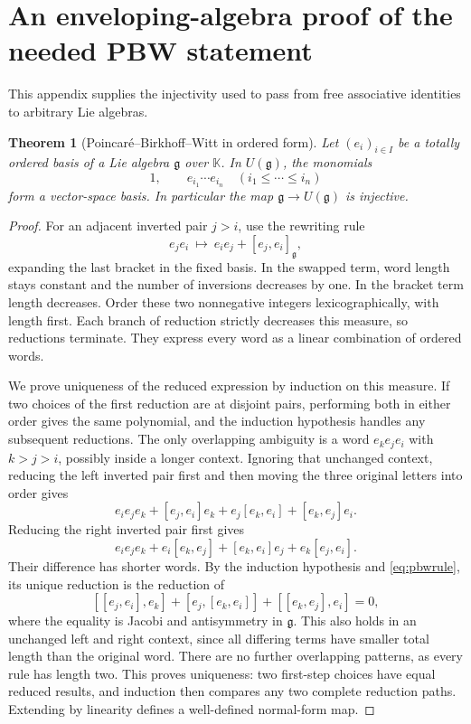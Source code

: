 \documentclass[11pt]{article}
\newtheorem{theorem}{Theorem}[section]
\theoremstyle{definition}
\theoremstyle{remark}
\newcommand{\K}{\mathbb K}
\newcommand{\g}{\mathfrak g}
\numberwithin{equation}{section}
\begin{document}
\appendix
\section{An enveloping-algebra proof of the needed PBW statement}\label{app:pbw}
This appendix supplies the injectivity used to pass from free associative identities to arbitrary Lie algebras.
\begin{theorem}[Poincar\'e--Birkhoff--Witt in ordered form]\label{thm:pbw}
Let $(e_i)_{i\in I}$ be a totally ordered basis of a Lie algebra $\g$ over $\K$. In $U(\g)$, the monomials
\[
 1,\qquad e_{i_1}\cdots e_{i_n}\quad(i_1\leq\cdots\leq i_n)
\]
form a vector-space basis. In particular the map $\g\to U(\g)$ is injective.
\end{theorem}
\begin{proof}
For an adjacent inverted pair $j>i$, use the rewriting rule
\begin{equation}\label{eq:pbwrule}
 e_je_i\ \longmapsto\ e_ie_j+[e_j,e_i]_{\g},
\end{equation}
expanding the last bracket in the fixed basis. In the swapped term, word length stays constant and the number of inversions decreases by one. In the bracket term length decreases. Order these two nonnegative integers lexicographically, with length first. Each branch of reduction strictly decreases this measure, so reductions terminate. They express every word as a linear combination of ordered words.

We prove uniqueness of the reduced expression by induction on this measure. If two choices of the first reduction are at disjoint pairs, performing both in either order gives the same polynomial, and the induction hypothesis handles any subsequent reductions. The only overlapping ambiguity is a word $e_ke_je_i$ with $k>j>i$, possibly inside a longer context. Ignoring that unchanged context, reducing the left inverted pair first and then moving the three original letters into order gives
\[
 e_ie_je_k+[e_j,e_i]e_k+e_j[e_k,e_i]+[e_k,e_j]e_i.
\]
Reducing the right inverted pair first gives
\[
 e_ie_je_k+e_i[e_k,e_j]+[e_k,e_i]e_j+e_k[e_j,e_i].
\]
Their difference has shorter words. By the induction hypothesis and \eqref{eq:pbwrule}, its unique reduction is the reduction of
\[
 [[e_j,e_i],e_k]+[e_j,[e_k,e_i]]+[[e_k,e_j],e_i]=0,
\]
where the equality is Jacobi and antisymmetry in $\g$. This also holds in an unchanged left and right context, since all differing terms have smaller total length than the original word. There are no further overlapping patterns, as every rule has length two. This proves uniqueness: two first-step choices have equal reduced results, and induction then compares any two complete reduction paths. Extending by linearity defines a well-defined normal-form map.


\end{proof}
\end{document}
